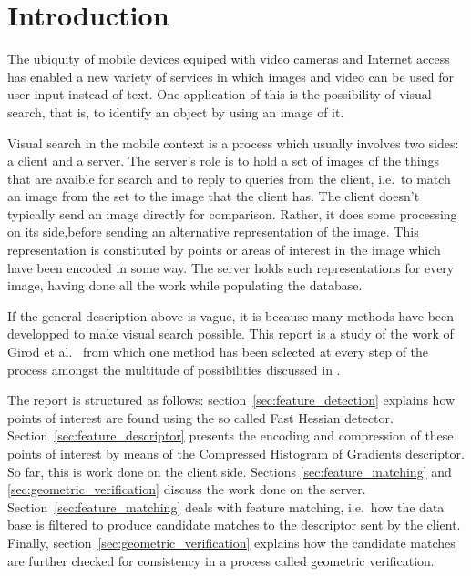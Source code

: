 \section{Introduction}

The ubiquity of mobile devices equiped with video cameras and Internet access has enabled a new variety of services in which images and video can be used for user input instead of text. One application of this is the possibility of visual search, that is, to identify an object by using an image of it.

Visual search in the mobile context is a process which usually involves two sides: a client and a server. The server's role is to hold a set of images of the things that are avaible for search and to reply to queries from the client, i.e.\ to match an image from the set to the image that the client has. The client doesn't typically send an image directly for comparison. Rather, it does some processing on its side,before sending an alternative representation of the image. This representation is constituted by points or areas of interest in the image which have been encoded in some way. The server holds such representations for every image, having done all the work while populating the database.

If the general description above is vague, it is because many methods have been developped to make visual search possible. This report is a study of the work of Girod et al.\ \cite{girod2011mobile} from which one method has been selected at every step of the process amongst the multitude of possibilities discussed in \cite{girod2011mobile}.

The report is structured as follows: section~\ref{sec:feature_detection} explains how points of interest are found using the so called Fast Hessian detector. Section~\ref{sec:feature_descriptor} presents the encoding and compression of these points of interest by means of the Compressed Histogram of Gradients descriptor. So far, this is work done on the client side. Sections \ref{sec:feature_matching} and \ref{sec:geometric_verification} discuss the work done on the server. Section~\ref{sec:feature_matching} deals with feature matching, i.e.\ how the data base is filtered to produce candidate matches to the descriptor sent by the client. Finally, section~\ref{sec:geometric_verification} explains how the candidate matches are further checked for consistency in a process called geometric verification.
